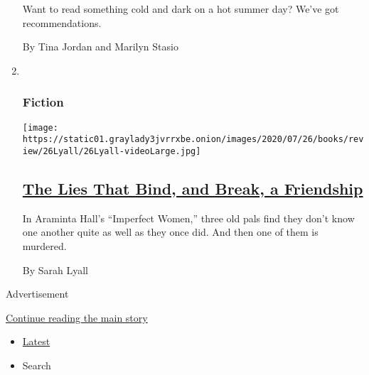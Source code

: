 \begin{enumerate}
  Want to read something cold and dark on a hot summer day? We've got
  recommendations.

  By Tina Jordan and Marilyn Stasio
\item ~
  \hypertarget{fiction-3}{%
  \subsubsection{Fiction}\label{fiction-3}}

  \texttt{[image: https://static01.graylady3jvrrxbe.onion/images/2020/07/26/books/review/26Lyall/26Lyall-videoLarge.jpg]}

  \hypertarget{the-lies-that-bind-and-break-a-friendship}{%
  \subsection{\texorpdfstring{\href{/2020/07/24/books/review/araminta-hall-imperfect-women.html}{The
  Lies That Bind, and Break, a
  Friendship}}{The Lies That Bind, and Break, a Friendship}}\label{the-lies-that-bind-and-break-a-friendship}}

  In Araminta Hall's ``Imperfect Women,'' three old pals find they don't
  know one another quite as well as they once did. And then one of them
  is murdered.

  By Sarah Lyall
\end{enumerate}

Advertisement

\protect\hyperlink{after-mid1}{Continue reading the main story}

\begin{itemize}
\tightlist
\item
  \protect\hyperlink{stream-panel}{Latest}
\item
  Search
\end{itemize}

